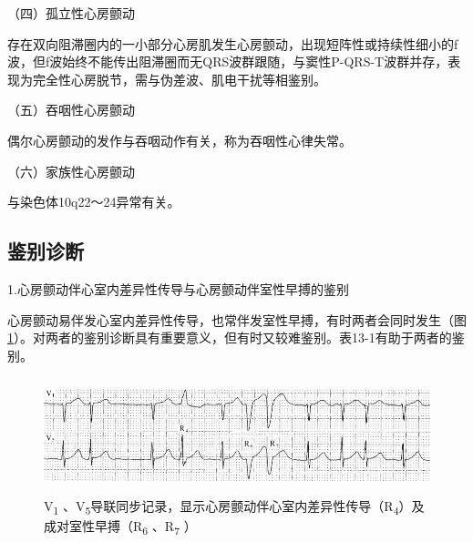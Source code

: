 （四）孤立性心房颤动

存在双向阻滞圈内的一小部分心房肌发生心房颤动，出现短阵性或持续性细小的f波，但f波始终不能传出阻滞圈而无QRS波群跟随，与窦性P-QRS-T波群并存，表现为完全性心房脱节，需与伪差波、肌电干扰等相鉴别。

（五）吞咽性心房颤动

偶尔心房颤动的发作与吞咽动作有关，称为吞咽性心律失常。

（六）家族性心房颤动

与染色体10q22～24异常有关。

\protect\hypertarget{text00020.htmlux5cux23subid211}{}{}

\subsection{鉴别诊断}

1.心房颤动伴心室内差异性传导与心房颤动伴室性早搏的鉴别

心房颤动易伴发心室内差异性传导，也常伴发室性早搏，有时两者会同时发生（图\ref{fig13-30}）。对两者的鉴别诊断具有重要意义，但有时又较难鉴别。表13-1有助于两者的鉴别。

\begin{figure}[!htbp]
 \centering
 \includegraphics[width=5.58333in,height=1.32292in]{./images/Image00238.jpg}
 \captionsetup{justification=centering}
 \caption{V\textsubscript{1} 、V\textsubscript{5}导联同步记录，显示心房颤动伴心室内差异性传导（R\textsubscript{4}）及成对室性早搏（R\textsubscript{6} 、R\textsubscript{7} ）}
 \label{fig13-30}
  \end{figure} 



